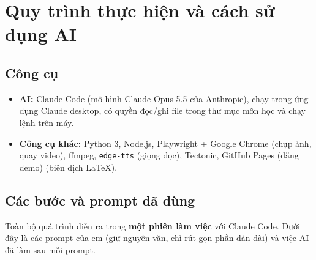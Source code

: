 \documentclass[12pt,a4paper]{article}
\begin{document}
\section{Quy trình thực hiện và cách sử dụng AI}\label{sec:quytrinh}
\subsection{Công cụ}
\begin{itemize}
  \item \textbf{AI:} Claude Code (mô hình Claude Opus 5.5 của Anthropic), chạy trong ứng dụng Claude desktop, có quyền đọc/ghi file trong thư mục môn học và chạy lệnh trên máy.
  \item \textbf{Công cụ khác:} Python 3, Node.js, Playwright + Google Chrome (chụp ảnh, quay video), ffmpeg, \texttt{edge-tts} (giọng đọc), Tectonic, GitHub Pages (đăng demo) (biên dịch LaTeX).
\end{itemize}

\subsection{Các bước và prompt đã dùng}
Toàn bộ quá trình diễn ra trong \textbf{một phiên làm việc} với Claude Code. Dưới đây là các prompt của em (giữ nguyên văn, chỉ rút gọn phần dán dài) và việc AI đã làm sau mỗi prompt.
\end{document}

